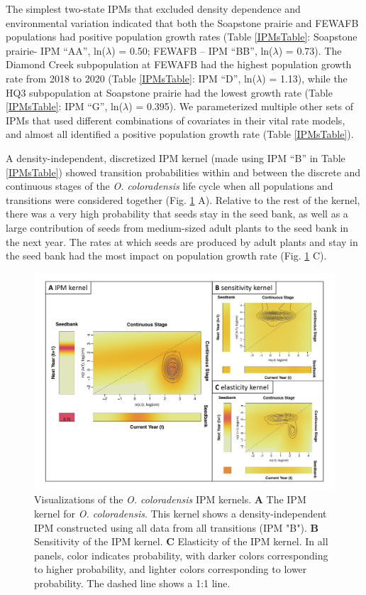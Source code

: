 \documentclass[12pt, letterpaper]{article}
\begin{document}
The simplest two-state IPMs that excluded density dependence and environmental variation indicated that both the Soapstone prairie and FEWAFB populations had positive population growth rates (Table \ref{IPMsTable}: Soapstone prairie- IPM “AA”, ln($\lambda$) = 0.50;  FEWAFB – IPM “BB”, ln($\lambda$) =  0.73). The Diamond Creek subpopulation at FEWAFB had the highest population growth rate from 2018 to 2020 (Table \ref{IPMsTable}: IPM “D”, ln($\lambda$) = 1.13), while the HQ3 subpopulation at Soapstone prairie had the lowest growth rate (Table \ref{IPMsTable}: IPM “G”, ln($\lambda$) = 0.395). We parameterized multiple other sets of IPMs that used different combinations of covariates in their vital rate models, and almost all identified a positive population growth rate (Table \ref{IPMsTable}).   

A density-independent, discretized IPM kernel (made using IPM “B” in Table \ref{IPMsTable}) showed transition probabilities within and between the discrete and continuous stages of the \textit{O. coloradensis} life cycle when all populations and transitions were considered together (Fig. \ref{fig:IPMKernel} A). Relative to the rest of the kernel, there was a very high probability that seeds stay in the seed bank, as well as a large contribution of seeds from medium-sized adult plants to the seed bank in the next year. The rates at which seeds are produced by adult plants and stay in the seed bank had the most impact on population growth rate (Fig. \ref{fig:IPMKernel} C).

\begin{figure}[h]
  \centering
  \includegraphics[width=\textwidth]{figures/KernelMultipanelFigure.pdf}
  \caption{Visualizations of the \textit{O. coloradensis} IPM kernels. \textbf{A} The IPM kernel for \textit{O. coloradensis}. This kernel shows a density-independent IPM constructed using all data from all transitions (IPM "B"). \textbf{B} Sensitivity of the IPM kernel. \textbf{C} Elasticity of the IPM kernel. In all panels, color indicates probability, with darker colors corresponding to higher probability, and lighter colors corresponding to lower probability. The dashed line shows a 1:1 line. }
  \label{fig:IPMKernel}
\end{figure} 
\end{document}
